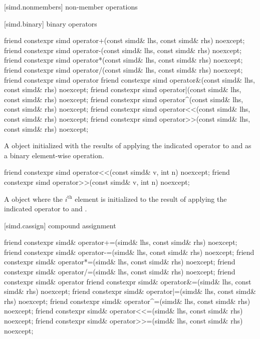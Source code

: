 [simd.nonmembers]{ non-member operations}

[simd.binary]{ binary operators}

\begin{itemdecl}
friend constexpr simd operator+(const simd& lhs, const simd& rhs) noexcept;
friend constexpr simd operator-(const simd& lhs, const simd& rhs) noexcept;
friend constexpr simd operator*(const simd& lhs, const simd& rhs) noexcept;
friend constexpr simd operator/(const simd& lhs, const simd& rhs) noexcept;
friend constexpr simd operator%
friend constexpr simd operator&(const simd& lhs, const simd& rhs) noexcept;
friend constexpr simd operator|(const simd& lhs, const simd& rhs) noexcept;
friend constexpr simd operator^(const simd& lhs, const simd& rhs) noexcept;
friend constexpr simd operator<<(const simd& lhs, const simd& rhs) noexcept;
friend constexpr simd operator>>(const simd& lhs, const simd& rhs) noexcept;
\end{itemdecl}

\begin{itemdescr}
  \pnum\ConstraintOperatorTWellFormed

  \pnum\returns
  A  object initialized with the results of applying the indicated operator to  and  as a binary element-wise operation.
\end{itemdescr}

\begin{itemdecl}
friend constexpr simd operator<<(const simd& v, int n) noexcept;
friend constexpr simd operator>>(const simd& v, int n) noexcept;
\end{itemdecl}

\begin{itemdescr}
  \pnum\ConstraintOperatorTWellFormed

  \pnum\returns
  A  object where the $i^\text{th}$ element is initialized to the result of applying the indicated operator to  and  \foralli.
\end{itemdescr}

[simd.cassign]{ compound assignment}

\begin{itemdecl}
friend constexpr simd& operator+=(simd& lhs, const simd& rhs) noexcept;
friend constexpr simd& operator-=(simd& lhs, const simd& rhs) noexcept;
friend constexpr simd& operator*=(simd& lhs, const simd& rhs) noexcept;
friend constexpr simd& operator/=(simd& lhs, const simd& rhs) noexcept;
friend constexpr simd& operator%
friend constexpr simd& operator&=(simd& lhs, const simd& rhs) noexcept;
friend constexpr simd& operator|=(simd& lhs, const simd& rhs) noexcept;
friend constexpr simd& operator^=(simd& lhs, const simd& rhs) noexcept;
friend constexpr simd& operator<<=(simd& lhs, const simd& rhs) noexcept;
friend constexpr simd& operator>>=(simd& lhs, const simd& rhs) noexcept;
\end{itemdecl}

